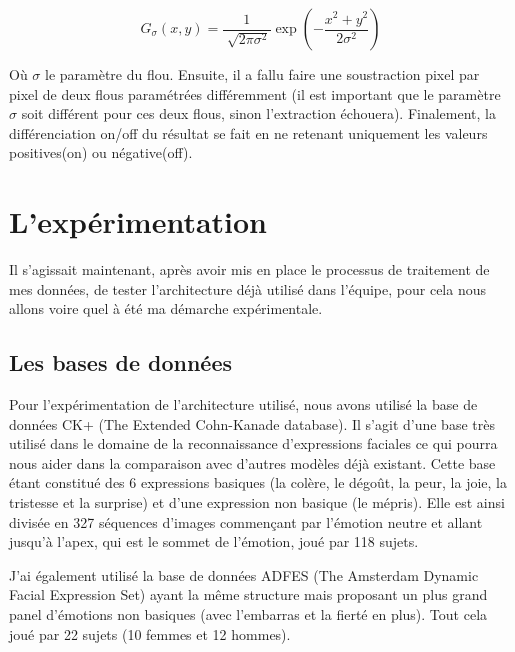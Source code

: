 \documentclass[12pt]{article}
\begin{document}
\[
	G_\sigma(x, y) = \dfrac{1}{\sqrt[]{2\pi\sigma^2}}\exp(-\dfrac{x^2 + y^2}{2\sigma^2})
\]

Où $\sigma$ le paramètre du flou. Ensuite, il a fallu faire une soustraction pixel par pixel de deux flous paramétrées différemment (il est important que le paramètre $\sigma$ soit différent pour ces deux flous, sinon l'extraction échouera). Finalement, la différenciation on/off du résultat se fait en ne retenant uniquement les valeurs positives(on) ou négative(off).

\pagebreak

\section{L'expérimentation}

Il s'agissait maintenant, après avoir mis en place le processus de traitement de mes données, de tester l'architecture déjà utilisé dans l'équipe, pour cela nous allons voire quel à été ma démarche expérimentale.

\subsection{Les bases de données}

Pour l'expérimentation de l'architecture utilisé, nous avons utilisé la base de données CK+\cite{ck} (The Extended Cohn-Kanade database). Il s'agit d'une base très utilisé dans le domaine de la reconnaissance d'expressions faciales ce qui pourra nous aider dans la comparaison avec d'autres modèles déjà existant. Cette base étant constitué des 6 expressions basiques (la colère, le dégoût, la peur, la joie, la tristesse et la surprise) et d'une expression non basique (le mépris). Elle est ainsi divisée en 327 séquences d'images commençant par l'émotion neutre et allant jusqu'à l'apex, qui est le sommet de l'émotion, joué par 118 sujets.

J'ai également utilisé la base de données ADFES\cite{adfes} (The Amsterdam Dynamic Facial Expression Set) ayant la même structure mais proposant un plus grand panel d'émotions non basiques (avec l'embarras et la fierté en plus). Tout cela joué par 22 sujets (10 femmes et 12 hommes).
\end{document}
